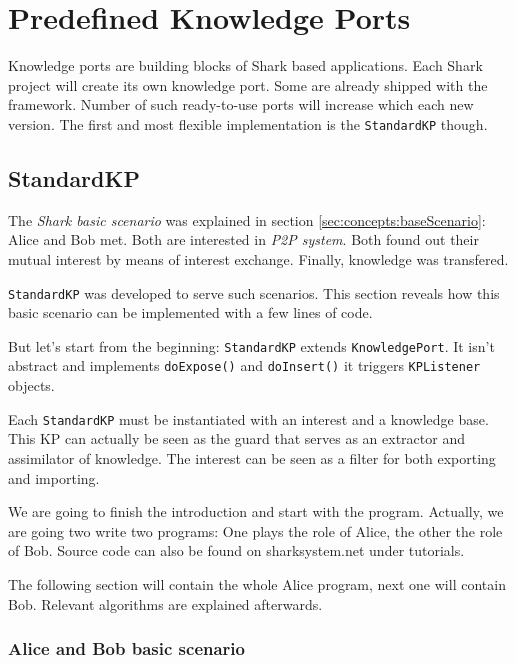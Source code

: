 \chapter{Predefined Knowledge Ports}
Knowledge ports are building blocks of Shark based applications.
Each Shark project will create its own knowledge port. Some are
already shipped with the framework. Number of such ready-to-use
ports will increase which each new version. The first and most flexible 
implementation is the {\tt StandardKP} though. 

\section{StandardKP}
\label{sec:knowledgePorts:StandardKP}
The  {\it Shark basic scenario} was explained in section \ref{sec:concepts:baseScenario}: Alice and Bob met. Both are interested in {\it P2P system}. Both found out their mutual interest by means of interest exchange. Finally, knowledge was transfered.

{\tt StandardKP} was developed to serve such scenarios. This section reveals how this basic scenario can be implemented with a few lines of code.

But let's start from the beginning: {\tt StandardKP} extends {\tt KnowledgePort}. It isn't abstract and implements {\tt doExpose()} and {\tt doInsert()} it triggers {\tt KPListener} objects.

Each {\tt StandardKP} must be instantiated with an interest and a knowledge base. This KP can actually be seen as the guard that serves as an extractor and
assimilator of knowledge. The interest can be seen as a filter for both exporting and importing. 

We are going to finish the introduction and start with the program. Actually, we are going two write two programs: One plays the role of Alice, the other the role of Bob. Source code can also be found on sharksystem.net under tutorials.

The following section will contain the whole Alice program, next one will contain Bob. Relevant algorithms are explained afterwards.

\subsection{Alice and Bob basic scenario}
